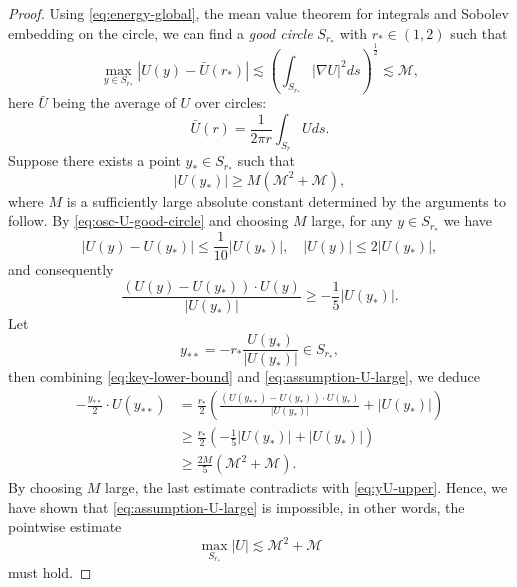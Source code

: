 \documentclass[12pt,reqno]{amsart}
\theoremstyle{plain}
\theoremstyle{definition}
\newcommand{\M}{\mathcal{M}}
\renewcommand{\:}{\colon}
\numberwithin{equation}{section}
\numberwithin{figure}{section}
\begin{document}
\begin{proof}
	
	Using \eqref{eq:energy-global}, the mean value theorem for integrals and Sobolev embedding on the circle, we can find a \textit{good circle} $S_{r_*}$ with $r_* \in (1,2)$ such that
	\begin{equation} \label{eq:osc-U-good-circle}
		\max_{y \in S_{r_*}} |U(y) - \bar{U}(r_*)| \lesssim \left(\int_{S_{r_*}} |\nabla U|^2 ds\right)^\frac12 \lesssim \M,
	\end{equation}
	here $\bar{U}$ being the average of $U$ over circles:
	\begin{equation} \label{eq:Ubar-def}
		\bar{U}(r) = \frac{1}{2\pi r} \int_{S_r} U ds.
	\end{equation}
	Suppose there exists a point $y_* \in S_{r_*}$ such that
	\begin{equation} \label{eq:assumption-U-large}
		|U(y_*)| \ge M (\M^2 + \M),
	\end{equation}
	where $M$ is a sufficiently large absolute constant determined by the arguments to follow. By \eqref{eq:osc-U-good-circle} and choosing $M$ large, for any $y \in S_{r_*}$ we have
	\begin{equation}
		|U(y) - U(y_*)| \le \frac{1}{10} |U(y_*)|, \quad |U(y)| \le 2 |U(y_*)|,
	\end{equation}
	and consequently
	\begin{equation} \label{eq:key-lower-bound}
		\frac{(U(y)-U(y_{*})) \cdot U(y)}{|U(y_*)|} \ge -\frac{1}{5} |U(y_*)|.
	\end{equation}
	Let 
	\begin{equation}
		y_{**} = -r_* \frac{U(y_*)}{|U(y_*)|} \in S_{r_*},
	\end{equation}
	then combining \eqref{eq:key-lower-bound} and \eqref{eq:assumption-U-large}, we deduce
	\begin{align}
		-\frac{y_{**}}{2} \cdot U(y_{**}) %
		&= \frac{r_*}{2} \left(\frac{(U(y_{**})-U(y_{*})) \cdot U(y_{*})}{|U(y_*)|} + |U(y_*)| \right) \nonumber \\
		&\ge \frac{r_*}{2} \left(-\frac{1}{5} |U(y_*)| + |U(y_*)|\right) \nonumber \\
		&\ge \frac{2 M}{5} (\M^2 + \M). 
	\end{align}
	By choosing $M$ large, the last estimate contradicts with \eqref{eq:yU-upper}. Hence, we have shown that \eqref{eq:assumption-U-large} is impossible, in other words, the pointwise estimate	    
	\begin{equation} \label{eq:good-rstar}
		\max_{S_{r_*}} |U| \lesssim \M^2 + \M
	\end{equation}
	 must hold.
	


\end{proof}
\end{document}
